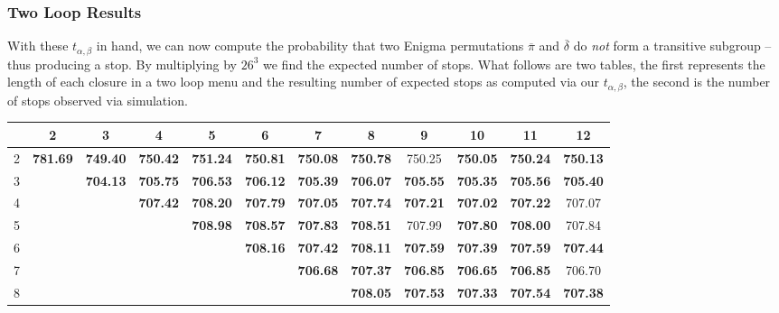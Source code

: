 \subsubsection{Two Loop Results}
With these $t_{\alpha, \beta}$ in hand, we can now compute the
probability that two Enigma permutations $\overline\pi$ and
$\overline\delta$ do \emph{not} form a transitive subgroup -- thus
producing a stop. By multiplying by $26^3$ we find the expected number of stops. What follows are two tables, the first represents the length of
each closure in a two loop menu and the resulting number of expected stops as computed via our $t_{\alpha, \beta}$, the second is the number of stops observed via simulation.
\begin{table}[H]
  \centering
  \begin{adjustbox}{max width=\textwidth,max height=2\textheight}
\begin{tabular}{|c|c|c|c|c|c|c|c|c|c|c|c|}
  \hline
  & 2       & 3       & 4       & 5       & 6       & 7       & 8       & 9       & 10      & 11      & 12      \\
  \hline
  2 & \textbf{781.69} & \textbf{749.40} & \textbf{750.42} & \textbf{751.24} & \textbf{750.81} & \textbf{750.08} & \textbf{750.78} & 750.25 & \textbf{750.05} & \textbf{750.24} & \textbf{750.13} \\
  \hline
  3 &               & \textbf{704.13} & \textbf{705.75} & \textbf{706.53} & \textbf{706.12} & \textbf{705.39} & \textbf{706.07} & \textbf{705.55} & \textbf{705.35} & \textbf{705.56} & \textbf{705.40} \\
  \hline
  4 &               &               & \textbf{707.42} & \textbf{708.20} & \textbf{707.79} & \textbf{707.05} & \textbf{707.74} & \textbf{707.21} & \textbf{707.02} & \textbf{707.22} & 707.07 \\
  \hline
  5 &               &               &               & \textbf{708.98} & \textbf{708.57} & \textbf{707.83} & \textbf{708.51} & 707.99 & \textbf{707.80} & \textbf{708.00} & 707.84 \\
  \hline
  6 &               &               &               &               & \textbf{708.16} & \textbf{707.42} & \textbf{708.11} & \textbf{707.59} & \textbf{707.39} & \textbf{707.59} & \textbf{707.44} \\
  \hline
  7 &               &               &               &               &               & \textbf{706.68} & \textbf{707.37} & \textbf{706.85} & \textbf{706.65} & \textbf{706.85} & 706.70 \\
  \hline
  8 &               &               &               &               &               &               & \textbf{708.05} & \textbf{707.53} & \textbf{707.33} & \textbf{707.54} & \textbf{707.38} \\

\end{tabular}
\end{adjustbox}
\end{table}
